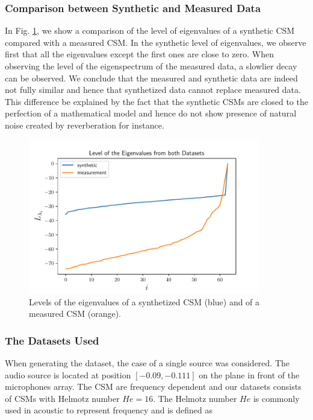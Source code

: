 \documentclass[11pt,a4paper,twoside]{report}
\begin{document}
\subsubsection{Comparison between Synthetic and Measured Data}

In Fig. \ref{fig:comparison_synthetic_measurement_data}, we show a comparison of the level of eigenvalues of a synthetic CSM compared with a measured CSM. In the synthetic level of eigenvalues, we observe first that all the eigenvalues except the first ones are close to zero. When observing the level of the eigenspectrum of the measured data, a slowlier decay can be observed. We conclude that the measured and synthetic data are indeed not fully similar and hence that synthetized data cannot replace measured data. This difference be explained by the fact that the synthetic CSMs are closed to the perfection of a mathematical model and hence do not show presence of natural noise created by reverberation for instance.

\begin{figure}
    \centering
    \includegraphics[width=0.9\textwidth]{figs/comparison_synthetic_measurement_data.pdf}
    \caption{Levels of the eigenvalues of a synthetized CSM (blue) and of a measured CSM (orange).}
    \label{fig:comparison_synthetic_measurement_data}    
\end{figure}


\subsubsection{The Datasets Used}

When generating the dataset, the case of a single source was considered. The audio source is located at position $[-0.09,-0.111]$ on the plane in front of the microphones array. The CSM are frequency dependent and our datasets consists of CSMs with Helmotz number $He = 16$. The Helmotz number $He$ is commonly used in acoustic to represent frequency and is defined as
\end{document}
